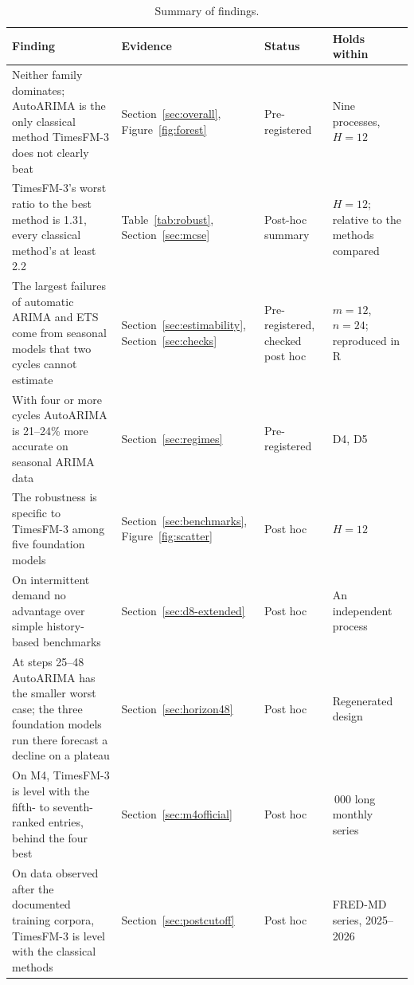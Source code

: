 \documentclass[ASNA]{USG}
\providecommand{\sectionref}[1]{Section~\ref{#1}}
\providecommand{\tableref}[1]{Table~\ref{#1}}
\providecommand{\figureref}[1]{Figure~\ref{#1}}
\begin{document}
\begin{table}[!htbp]
\centering
\begin{threeparttable}
\caption{Summary of findings.}
\label{tab:findings}
\small
\begin{tabular}{>{\raggedright\arraybackslash}p{5.6cm}>{\raggedright\arraybackslash}p{2.1cm}>{\raggedright\arraybackslash}p{2.4cm}>{\raggedright\arraybackslash}p{3.9cm}}
\toprule
Finding & Evidence & Status & Holds within \\
\midrule
Neither family dominates; AutoARIMA is the only classical method TimesFM-3 does not clearly beat &
  \sectionref{sec:overall}, \figureref{fig:forest} & Pre-registered & Nine processes, $H = 12$ \\[2pt]
TimesFM-3's worst ratio to the best method is 1.31, every classical method's at least 2.2 &
  \tableref{tab:robust}, \sectionref{sec:mcse} & Post-hoc summary & $H = 12$; relative to the methods compared \\[2pt]
The largest failures of automatic ARIMA and ETS come from seasonal models that two cycles cannot estimate &
  \sectionref{sec:estimability}, \sectionref{sec:checks} & Pre-registered, checked post hoc & $m = 12$, $n = 24$; reproduced in R \\[2pt]
With four or more cycles AutoARIMA is 21--24\% more accurate on seasonal ARIMA data &
  \sectionref{sec:regimes} & Pre-registered & D4, D5 \\[2pt]
The robustness is specific to TimesFM-3 among five foundation models &
  \sectionref{sec:benchmarks}, \figureref{fig:scatter} & Post hoc & $H = 12$ \\[2pt]
On intermittent demand no advantage over simple history-based benchmarks &
  \sectionref{sec:d8-extended} & Post hoc & An independent process \\[2pt]
At steps 25--48 AutoARIMA has the smaller worst case; the three foundation models run there forecast a decline on a plateau &
  \sectionref{sec:horizon48} & Post hoc & Regenerated design \\[2pt]
On M4, TimesFM-3 is level with the fifth- to seventh-ranked entries, behind the four best &
  \sectionref{sec:m4official} & Post hoc & 1\,000 long monthly series \\[2pt]
On data observed after the documented training corpora, TimesFM-3 is level with the classical methods &
  \sectionref{sec:postcutoff} & Post hoc & 101 FRED-MD series, 2025--2026 \\
\bottomrule
\end{tabular}
\end{threeparttable}
\end{table}
\end{document}
